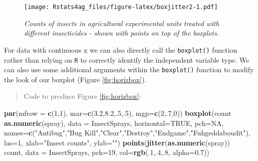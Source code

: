 \documentclass[letterpaper,]{book}
\newenvironment{Shaded}{\begin{snugshade}}{\end{snugshade}}
\newcommand{\DataTypeTok}[1]{\textcolor[rgb]{0.13,0.29,0.53}{#1}}
\newcommand{\DecValTok}[1]{\textcolor[rgb]{0.00,0.00,0.81}{#1}}
\newcommand{\FloatTok}[1]{\textcolor[rgb]{0.00,0.00,0.81}{#1}}
\newcommand{\KeywordTok}[1]{\textcolor[rgb]{0.13,0.29,0.53}{\textbf{#1}}}
\newcommand{\NormalTok}[1]{#1}
\newcommand{\OperatorTok}[1]{\textcolor[rgb]{0.81,0.36,0.00}{\textbf{#1}}}
\newcommand{\OtherTok}[1]{\textcolor[rgb]{0.56,0.35,0.01}{#1}}
\newcommand{\StringTok}[1]{\textcolor[rgb]{0.31,0.60,0.02}{#1}}
\begin{document}
\begin{figure}
\centering
\texttt{[image: Rstats4ag\_files/figure-latex/boxjitter2-1.pdf]}
\caption{\label{fig:boxjitter2}\emph{Counts of insects in agricultural experimental units treated with different insecticides - shown with points on top of the boxplots.}}
\end{figure}

For data with continuous x we can also directly call the \texttt{boxplot()} function rather than relying on \texttt{R} to correctly identify the independent variable type. We can also use some additional arguments within the \texttt{boxplot()} function to modify the look of our boxplot (Figure \ref{fig:horizbox}).

\begin{quote}
Code to produce Figure \ref{fig:horizbox}:
\end{quote}

\begin{Shaded}
\begin{Highlighting}[]
\KeywordTok{par}\NormalTok{(}\DataTypeTok{mfrow =} \KeywordTok{c}\NormalTok{(}\DecValTok{1}\NormalTok{,}\DecValTok{1}\NormalTok{), }\DataTypeTok{mar=}\KeywordTok{c}\NormalTok{(}\FloatTok{3.2}\NormalTok{,}\FloatTok{8.2}\NormalTok{,.}\DecValTok{5}\NormalTok{,.}\DecValTok{5}\NormalTok{), }\DataTypeTok{mgp=}\KeywordTok{c}\NormalTok{(}\DecValTok{2}\NormalTok{,.}\DecValTok{7}\NormalTok{,}\DecValTok{0}\NormalTok{))}
\KeywordTok{boxplot}\NormalTok{(count }\OperatorTok{~}\StringTok{ }\KeywordTok{as.numeric}\NormalTok{(spray), }\DataTypeTok{data =}\NormalTok{ InsectSprays, }\DataTypeTok{horizontal=}\OtherTok{TRUE}\NormalTok{, }\DataTypeTok{pch=}\OtherTok{NA}\NormalTok{,}
        \DataTypeTok{names=}\KeywordTok{c}\NormalTok{(}\StringTok{"Antibug"}\NormalTok{,}\StringTok{"Bug Kill"}\NormalTok{,}\StringTok{"Clear"}\NormalTok{,}\StringTok{"Destroy"}\NormalTok{,}\StringTok{"Endgame"}\NormalTok{,}\StringTok{"Fuhgeddaboudit"}\NormalTok{),}
        \DataTypeTok{las=}\DecValTok{1}\NormalTok{, }\DataTypeTok{xlab=}\StringTok{"Insect counts"}\NormalTok{, }\DataTypeTok{ylab=}\StringTok{""}\NormalTok{)}
\KeywordTok{points}\NormalTok{(}\KeywordTok{jitter}\NormalTok{(}\KeywordTok{as.numeric}\NormalTok{(spray)) }\OperatorTok{~}\StringTok{ }\NormalTok{count, }\DataTypeTok{data =}\NormalTok{ InsectSprays,}
       \DataTypeTok{pch=}\DecValTok{19}\NormalTok{, }\DataTypeTok{col=}\KeywordTok{rgb}\NormalTok{(.}\DecValTok{1}\NormalTok{,.}\DecValTok{4}\NormalTok{,.}\DecValTok{8}\NormalTok{, }\DataTypeTok{alpha=}\FloatTok{0.7}\NormalTok{))}
\end{Highlighting}
\end{Shaded}
\end{document}
